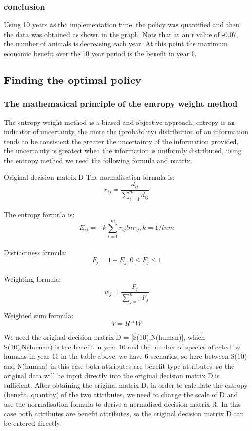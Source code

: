 \documentclass{mcmthesis}
\numberwithin{figure}{section}
\numberwithin{table}{section}
\numberwithin{equation}{section}
\begin{document}
\subsubsection{conclusion}
Using 10 years as the implementation time, the policy was quantified and then the data was obtained as shown in the graph.
Note that at an r value of -0.07, the number of animals is decreasing each year. At this point the maximum economic benefit over the 10 year period is the benefit in year 0.

\subsection{Finding the optimal policy}
\subsubsection{The mathematical principle of the entropy weight method}
The entropy weight method is a biased and objective approach, entropy is an indicator of uncertainty, the more the (probability) distribution of an information tends to be consistent the greater the uncertainty of the information provided, the uncertainty is greatest when the information is uniformly distributed, using the entropy method we need the following formula and matrix.

Original decision matrix D
The normalisation formula is: 
\begin{equation}
	r_{ij}=\frac{d_{ij}}{\sum_{i=1}^m{d_{ij}}} 
	\label{E 6.1}
\end{equation}
\\
The entropy formula is: 
\begin{equation}
	E_{ij}=-k\sum_{i=1}^m{r_{ij}lnr_{ij}},k=1/lnm
	\label{E 6.2}
\end{equation}
\\
Distinctness formula:
\begin{equation}
	F_j=1-E_j, 0\le F_j \le 1
	\label{E 6.3}
\end{equation}
\\
Weighting formula: 
\begin{equation}
	w_j=\frac{F_j}{\sum_{j=1}^nF_j}
	\label{E 6.4}
\end{equation}

Weighted sum formula: 
\begin{equation}
	V=R*W
	\label{E 6.5}
\end{equation}

We need the original decision matrix D = [S(10),N(human)], which S(10),N(human) is the benefit in year 10 and the number of species affected by humans in year 10 in the table above, we have 6 scenarios, so here between S(10) and N(human) in this case both attributes are benefit type attributes, so the original data will be input directly into the original decision matrix D is sufficient. After obtaining the original matrix D, in order to calculate the entropy (benefit, quantity) of the two attributes, we need to change the scale of D and use the normalisation formula to derive a normalised decision matrix R. In this case both attributes are benefit attributes, so the original decision matrix D can be entered directly. 
\end{document}

